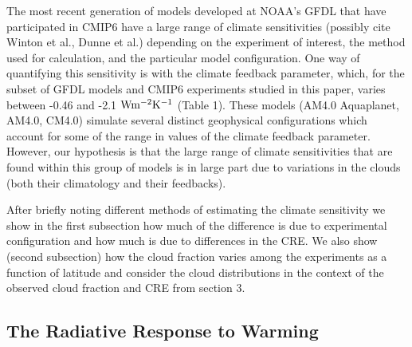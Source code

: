 \documentclass[draft]{agujournal2019}
\begin{document}
The most recent generation of models developed at NOAA's GFDL that have participated in CMIP6 have a large range of climate 
sensitivities (possibly cite Winton et al., Dunne et al.) depending on the experiment of interest, the method used for 
calculation, and the particular model configuration.  One way of quantifying this sensitivity is with the climate feedback parameter, which, for the subset of GFDL models and CMIP6 experiments studied in this paper, varies between -0.46 and -2.1 $\rm{W m^{-2}K^{-1}}$ (Table 1).  
These models (AM4.0 Aquaplanet, AM4.0, CM4.0) simulate several 
distinct geophysical configurations which account for some of the range in values of the climate feedback parameter.  
However, our hypothesis is that the large range of climate sensitivities that are found within this 
group of models is in large part due to variations in the clouds (both their climatology and their feedbacks).


After briefly noting different methods of estimating the climate sensitivity we show in the first subsection how much of the difference is 
due to experimental configuration and how much is due to differences in the CRE.  
We also show (second subsection) how the cloud fraction varies among
the experiments as a function of latitude and consider the cloud distributions in the context of the observed
cloud fraction and CRE from section 3.  

\subsection{The Radiative Response to Warming}

%
\end{document}
